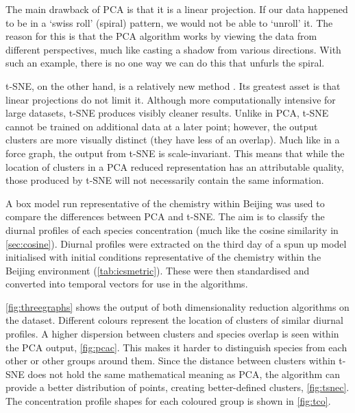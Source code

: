 The main drawback of PCA is that it is a linear projection. If our data happened to be in a `swiss roll' (spiral) pattern, we would not be able to `unroll' it. The reason for this is that the PCA algorithm works by viewing the data from different perspectives, much like casting a shadow from various directions. With such an example, there is no one way we can do this that unfurls the spiral.

t-SNE, on the other hand, is a relatively new method \citep{tsne}. Its greatest asset is that linear projections do not limit it. Although more computationally intensive for large datasets, t-SNE produces visibly cleaner results. Unlike in PCA, t-SNE cannot be trained on additional data at a later point; however, the output clusters are more visually distinct (they have less of an overlap). Much like in a force graph, the output from t-SNE is scale-invariant. This means that while the location of clusters in a PCA reduced representation has an attributable quality, those produced by t-SNE will not necessarily contain the same information.

A box model run representative of the chemistry within Beijing was used to compare the differences between PCA and t-SNE. The aim is to classify the diurnal profiles of each species concentration (much like the cosine similarity in \autoref{sec:cosine}).
Diurnal profiles were extracted on the third day of a spun up model initialised with initial conditions representative of the chemistry within the Beijing environment (\autoref{tab:icsmetric}).
These were then standardised and converted into temporal vectors for use in the algorithms.

\autoref{fig:threegraphs} shows the output of both dimensionality reduction algorithms on the dataset. Different colours represent the location of clusters of similar diurnal profiles. A higher dispersion between clusters and species overlap is seen within the PCA output, \autoref{fig:pcac}. This makes it harder to distinguish species from each other or other groups around them.
Since the distance between clusters within t-SNE does not hold the same mathematical meaning as PCA, the algorithm can provide a better distribution of points, creating better-defined clusters, \autoref{fig:tsnec}. The concentration profile shapes for each coloured group is shown in \autoref{fig:tco}.


